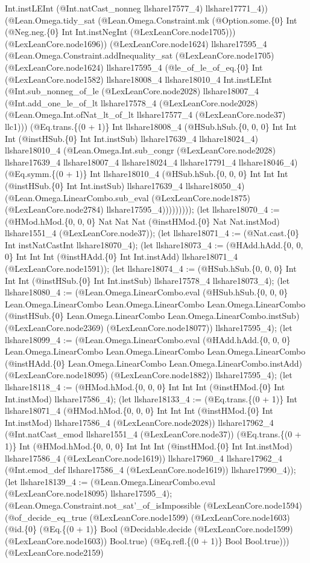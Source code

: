 \documentclass[11pt]{article}
\begin{document}
Int.instLEInt (@Int.natCast\_nonneg llshare17577\_4) llshare17771\_4)) (@Lean.Omega.tidy\_sat (@Lean.Omega.Constraint.mk (@Option.some.\{0\} Int (@Neg.neg.\{0\} Int Int.instNegInt (@LexLeanCore.node1705))) (@LexLeanCore.node1696)) (@LexLeanCore.node1624) llshare17595\_4 (@Lean.Omega.Constraint.addInequality\_sat (@LexLeanCore.node1705) (@LexLeanCore.node1624) llshare17595\_4 (@le\_of\_le\_of\_eq.\{0\} Int (@LexLeanCore.node1582) llshare18008\_4 llshare18010\_4 Int.instLEInt (@Int.sub\_nonneg\_of\_le (@LexLeanCore.node2028) llshare18007\_4 (@Int.add\_one\_le\_of\_lt llshare17578\_4 (@LexLeanCore.node2028) (@Lean.Omega.Int.ofNat\_lt\_of\_lt llshare17577\_4 (@LexLeanCore.node37) llc1))) (@Eq.trans.\{(0 + 1)\} Int llshare18008\_4 (@HSub.hSub.\{0, 0, 0\} Int Int Int (@instHSub.\{0\} Int Int.instSub) llshare17639\_4 llshare18024\_4) llshare18010\_4 (@Lean.Omega.Int.sub\_congr (@LexLeanCore.node2028) llshare17639\_4 llshare18007\_4 llshare18024\_4 llshare17791\_4 llshare18046\_4) (@Eq.symm.\{(0 + 1)\} Int llshare18010\_4 (@HSub.hSub.\{0, 0, 0\} Int Int Int (@instHSub.\{0\} Int Int.instSub) llshare17639\_4 llshare18050\_4) (@Lean.Omega.LinearCombo.sub\_eval (@LexLeanCore.node1875) (@LexLeanCore.node2784) llshare17595\_4))))))))); (let llshare18070\_4 := (@HMod.hMod.\{0, 0, 0\} Nat Nat Nat (@instHMod.\{0\} Nat Nat.instMod) llshare1551\_4 (@LexLeanCore.node37)); (let llshare18071\_4 := (@Nat.cast.\{0\} Int instNatCastInt llshare18070\_4); (let llshare18073\_4 := (@HAdd.hAdd.\{0, 0, 0\} Int Int Int (@instHAdd.\{0\} Int Int.instAdd) llshare18071\_4 (@LexLeanCore.node1591)); (let llshare18074\_4 := (@HSub.hSub.\{0, 0, 0\} Int Int Int (@instHSub.\{0\} Int Int.instSub) llshare17578\_4 llshare18073\_4); (let llshare18080\_4 := (@Lean.Omega.LinearCombo.eval (@HSub.hSub.\{0, 0, 0\} Lean.Omega.LinearCombo Lean.Omega.LinearCombo Lean.Omega.LinearCombo (@instHSub.\{0\} Lean.Omega.LinearCombo Lean.Omega.LinearCombo.instSub) (@LexLeanCore.node2369) (@LexLeanCore.node18077)) llshare17595\_4); (let llshare18099\_4 := (@Lean.Omega.LinearCombo.eval (@HAdd.hAdd.\{0, 0, 0\} Lean.Omega.LinearCombo Lean.Omega.LinearCombo Lean.Omega.LinearCombo (@instHAdd.\{0\} Lean.Omega.LinearCombo Lean.Omega.LinearCombo.instAdd) (@LexLeanCore.node18095) (@LexLeanCore.node1882)) llshare17595\_4); (let llshare18118\_4 := (@HMod.hMod.\{0, 0, 0\} Int Int Int (@instHMod.\{0\} Int Int.instMod) llshare17586\_4); (let llshare18133\_4 := (@Eq.trans.\{(0 + 1)\} Int llshare18071\_4 (@HMod.hMod.\{0, 0, 0\} Int Int Int (@instHMod.\{0\} Int Int.instMod) llshare17586\_4 (@LexLeanCore.node2028)) llshare17962\_4 (@Int.natCast\_emod llshare1551\_4 (@LexLeanCore.node37)) (@Eq.trans.\{(0 + 1)\} Int (@HMod.hMod.\{0, 0, 0\} Int Int Int (@instHMod.\{0\} Int Int.instMod) llshare17586\_4 (@LexLeanCore.node1619)) llshare17960\_4 llshare17962\_4 (@Int.emod\_def llshare17586\_4 (@LexLeanCore.node1619)) llshare17990\_4)); (let llshare18139\_4 := (@Lean.Omega.LinearCombo.eval (@LexLeanCore.node18095) llshare17595\_4); (@Lean.Omega.Constraint.not\_sat'\_of\_isImpossible (@LexLeanCore.node1594) (@of\_decide\_eq\_true (@LexLeanCore.node1599) (@LexLeanCore.node1603) (@id.\{0\} (@Eq.\{(0 + 1)\} Bool (@Decidable.decide (@LexLeanCore.node1599) (@LexLeanCore.node1603)) Bool.true) (@Eq.refl.\{(0 + 1)\} Bool Bool.true))) (@LexLeanCore.node2159) 
\end{document}
